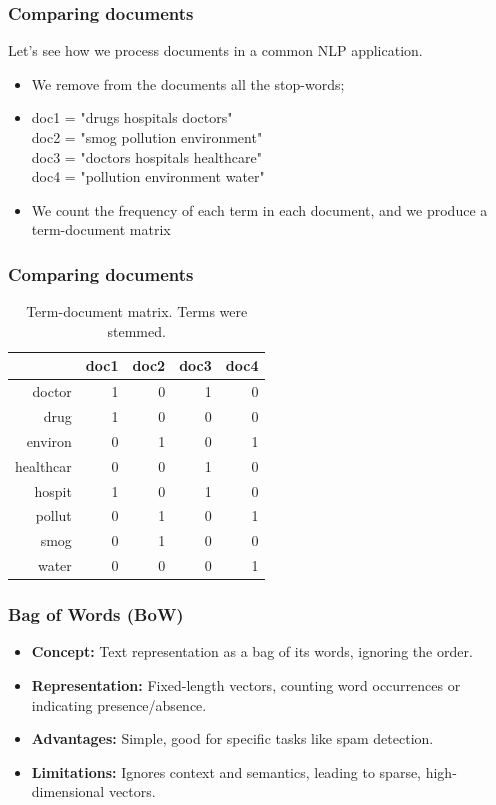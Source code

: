 \documentclass[serif, aspectratio=169]{beamer}
\begin{document}
\begin{frame}
\frametitle{Comparing documents}

Let's see how we process documents in a common NLP application.

\begin{itemize}

\item<1-> We remove from the documents all the stop-words;

\item<2-> doc1 = "drugs hospitals doctors" \\
doc2 = "smog pollution environment" \\
doc3 = "doctors hospitals healthcare" \\
doc4 = "pollution environment water" \\

\item<3-> We count the frequency of each term in each document, and we produce a term-document matrix

\end{itemize}

\end{frame}

\begin{frame}
\frametitle{Comparing documents}

\begin{table}[ht]
\centering
\begin{tabular}{rrrrr}
  \hline
 & doc1 & doc2 & doc3 & doc4 \\ 
  \hline
doctor & 1 & 0 & 1 & 0 \\ 
  drug & 1 & 0 & 0 & 0 \\ 
  environ & 0 & 1 & 0 & 1 \\ 
  healthcar & 0 & 0 & 1 & 0 \\ 
  hospit & 1 & 0 & 1 & 0 \\ 
  pollut & 0 & 1 & 0 & 1 \\ 
  smog & 0 & 1 & 0 & 0 \\ 
  water & 0 & 0 & 0 & 1 \\ 
   \hline
\end{tabular}
\caption{Term-document matrix. Terms were stemmed.} 
\label{tab:example1-tf-table}
\end{table}

\end{frame}


\begin{frame}
\frametitle{Bag of Words (BoW)}
\begin{itemize}
    \item \textbf{Concept:} Text representation as a bag of its words, ignoring the order.
    \item \textbf{Representation:} Fixed-length vectors, counting word occurrences or indicating presence/absence.
    \item \textbf{Advantages:} Simple, good for specific tasks like spam detection.
    \item \textbf{Limitations:} Ignores context and semantics, leading to sparse, high-dimensional vectors.
\end{itemize}
\end{frame}
\end{document}
